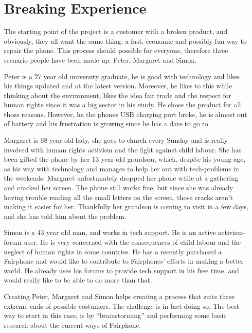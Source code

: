 \documentclass[final]{scrreprt} %
\begin{document}
\chapter{Breaking Experience}
\label{ch:breaking-experience}
The starting point of the project is a customer with a broken product, and obviously, they all want the same thing: a fast, economic and possibly fun way to repair the phone. This process should possible for everyone, therefore three scenario people have been made up: Peter, Margaret and Simon.

Peter is a 27 year old university graduate, he is good with technology and likes his things updated and at the latest version. Moreover, he likes to this while thinking about the environment, likes the idea fair trade and the respect for human rights since it was a big sector in his study. He chose the product for all those reasons. However, he the phones USB charging port broke, he is almost out of battery and his frustration is growing since he has a date to go to. 

Margaret is 68 year old lady, she goes to church every Sunday and is really involved with human rights activism and the fight against child labour. She has been gifted the phone by her 13 year old grandson, which, despite his young age, as his way with technology and manages to help her out with tech-problems in the weekends. Margaret unfortunately dropped her phone while at a gathering and cracked her screen. The phone still works fine, but since she was already having trouble reading all the small letters on the screen, those cracks aren't making it easier for her. Thankfully her grandson is coming to visit in a few days, and she has told him about the problem.

Simon is a 43 year old man, and works in tech support. He is an active activism-forum user. He is very concerned with the consequences of child labour and the neglect of human rights in some countries. He has a recently purchased a Fairphone and would like to contribute to Fairphones' efforts in making a better world. He already uses his forums to provide tech support in his free time, and would really like to be able to do more than that.

Creating Peter, Margaret and Simon helps creating a process that suits three extreme ends of possible costumers. The challenge is in fact doing so. The best way to start in this case, is by ``brainstorming'' and performing some basic research about the current ways of Fairphone.
\end{document}
